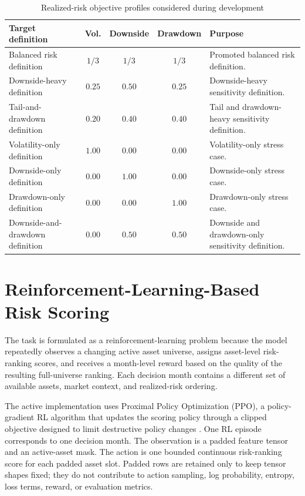 \begin{table}[H]
\centering
\scriptsize
\caption{Realized-risk objective profiles considered during development}
\label{tab:objective_profiles}
\begin{tabularx}{\textwidth}{L{3.7cm}cccY}
\toprule
Target definition & Vol. & Downside & Drawdown & Purpose \\
\midrule
Balanced risk definition & \(1/3\) & \(1/3\) & \(1/3\) & Promoted balanced risk definition. \\
Downside-heavy definition & \(0.25\) & \(0.50\) & \(0.25\) & Downside-heavy sensitivity definition. \\
Tail-and-drawdown definition & \(0.20\) & \(0.40\) & \(0.40\) & Tail and drawdown-heavy sensitivity definition. \\
Volatility-only definition & \(1.00\) & \(0.00\) & \(0.00\) & Volatility-only stress case. \\
Downside-only definition & \(0.00\) & \(1.00\) & \(0.00\) & Downside-only stress case. \\
Drawdown-only definition & \(0.00\) & \(0.00\) & \(1.00\) & Drawdown-only stress case. \\
Downside-and-drawdown definition & \(0.00\) & \(0.50\) & \(0.50\) & Downside and drawdown-only sensitivity definition. \\
\bottomrule
\end{tabularx}
\end{table}

\section{Reinforcement-Learning-Based Risk Scoring}
\label{sec:rl_risk_scoring}

The task is formulated as a reinforcement-learning problem because the model repeatedly observes a changing active asset universe, assigns asset-level risk-ranking scores, and receives a month-level reward based on the quality of the resulting full-universe ranking. Each decision month contains a different set of available assets, market context, and realized-risk ordering.

The active implementation uses Proximal Policy Optimization (PPO), a policy-gradient RL algorithm that updates the scoring policy through a clipped objective designed to limit destructive policy changes \cite{schulman2017ppo}. One RL episode corresponds to one decision month. The observation is a padded feature tensor and an active-asset mask. The action is one bounded continuous risk-ranking score for each padded asset slot. Padded rows are retained only to keep tensor shapes fixed; they do not contribute to action sampling, log probability, entropy, loss terms, reward, or evaluation metrics.

